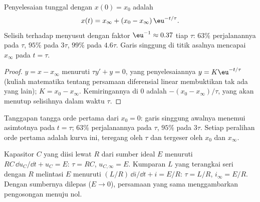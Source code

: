 \begin{theorem}[Penyelesaian]\label{thm:b1:transient-regimes:firstorder}
Penyelesaian tunggal dengan $x(0) = x_0$ adalah
\[
x(t) = x_\infty + (x_0 - x_\infty)\,\eu^{-t/\tau} .
\]
Selisih terhadap  menyusut dengan faktor $\eu^{-1} \approx
0.37$ tiap $\tau$: $63\%$ perjalanannya pada $\tau$, $95\%$ pada
$3\tau$, $99\%$ pada $4.6\tau$. Garis singgung di titik asalnya
mencapai $x_\infty$ pada $t = \tau$.
\end{theorem}

\begin{proof}
$y = x - x_\infty$ menuruti $\tau y' + y = 0$, yang penyelesaiannya
$y = K\eu^{-t/\tau}$ (kuliah matematika tentang persamaan diferensial
linear membuktikan tak ada yang lain); $K = x_0 - x_\infty$.
Kemiringannya di $0$ adalah $-(x_0 - x_\infty)/\tau$, yang akan menutup
selisihnya dalam waktu $\tau$.
\end{proof}

\begin{omfigure}

{\small Tanggapan tangga orde pertama dari $x_0 = 0$: garis singgung
awalnya menemui asimtotnya pada $t = \tau$; $63\%$ perjalanannya pada
$\tau$, $95\%$ pada $3\tau$. Setiap peralihan orde pertama adalah kurva
ini, teregang oleh $\tau$ dan tergeser oleh $x_0$ dan $x_\infty$.}
\end{omfigure}

\begin{proposition}\label{prop:b1:transient-regimes:rcrl}
Kapasitor $C$ yang diisi lewat  $R$ dari sumber ideal $E$
menuruti $RC\,\dd u_C/\dd t + u_C = E$: $\tau = RC$, $u_{C,\infty} = E$.
Kumparan $L$ yang terangkai seri dengan $R$ melintasi $E$ menuruti
$(L/R)\,\dd i/\dd t + i =
E/R$: $\tau = L/R$, $i_\infty = E/R$. Dengan sumbernya dilepas
($E \to 0$), persamaan yang sama menggambarkan pengosongan menuju nol.
\end{proposition}

